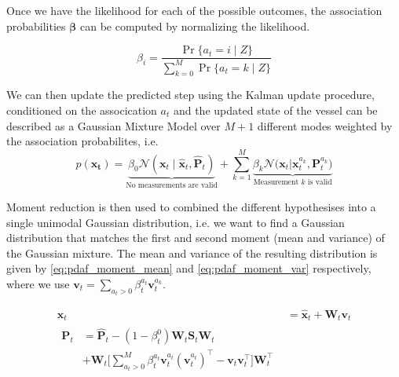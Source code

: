 Once we have the likelihood for each of the possible outcomes, the association probabilities $\boldsymbol{\beta}$ can be computed by normalizing the likelihood. 

\begin{equation}
    \beta_i = \frac{\Pr\{a_t=i \; | \; Z\}}{\sum_{k=0}^M \Pr\{a_t=k \; | \; Z\}}
\end{equation}

We can then update the predicted step using the Kalman update procedure, conditioned on the assocication $a_t$ and the updated state of the vessel can be described as a Gaussian Mixture Model over $M+1$ different modes weighted by the association probabilites, i.e. 
\begin{equation}
    p(\boldsymbol{x_t}) = \underbrace{\beta_0 \mathcal{N}(\boldsymbol{x}_t \; | \; \hat{\boldsymbol{x}}_t, \hat{\boldsymbol{P}}_t)}_{\text{No measurements are valid}} + \sum_{k=1}^M \underbrace{\beta_k \mathcal{N}\big(\boldsymbol{x}_t | \boldsymbol{x}_t^{a_k}, \boldsymbol{P}_t^{a_k}\big)}_{\text{Measurement $k$ is valid}}
\end{equation}

Moment reduction is then used to combined the different hypothesises into a single unimodal Gaussian distribution, i.e. we want to find a Gaussian distribution that matches the first and second moment (mean and variance) of the Gaussian mixture. The mean and variance of the resulting distribution is given by \cref{eq:pdaf_moment_mean} and \cref{eq:pdaf_moment_var} respectively, where we use $\boldsymbol{v}_t = \sum_{a_t > 0} \beta_t^{a_t} \boldsymbol{v}_t^{a_k}$. 

\begin{subequations}
\begin{align}
    \boldsymbol{x}_t &= \hat{\boldsymbol{x}}_t + \boldsymbol{W}_t \boldsymbol{v}_t \label{eq:pdaf_moment_mean}\\
    \begin{split}
    \boldsymbol{P}_t &= \hat{\boldsymbol{P}}_t - (1 - \beta_t^{0}) \boldsymbol{W}_t \boldsymbol{S}_t  \boldsymbol{W}_t\\ &+ \boldsymbol{W}_t \big[\sum_{a_t > 0}^M \beta_t^{a_t} \boldsymbol{v}_t^{a_t} (\boldsymbol{v}_t^{a_t})^\intercal - \boldsymbol{v}_t \boldsymbol{v}_t^\intercal \big] \boldsymbol{W}_t^\intercal\label{eq:pdaf_moment_var}
    \end{split}
\end{align}
\end{subequations}

